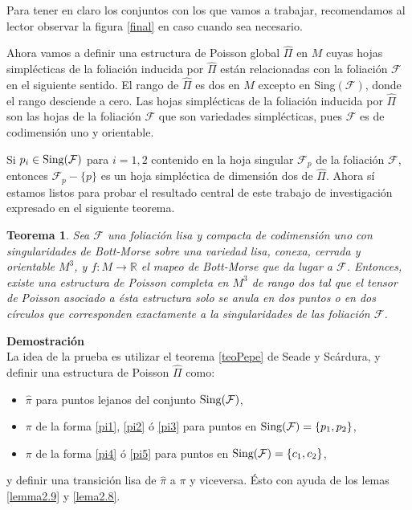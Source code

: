 \documentclass[a4paper,10pt]{book}
\newtheorem{teo}{Teorema}[chapter]
\begin{document}
Para tener en claro los conjuntos con los que vamos a trabajar, recomendamos al lector observar la figura \ref{final} en caso cuando sea necesario.
\vspace{5mm}

Ahora vamos a definir una estructura de Poisson global $\hat{\Pi}$ en $M$ cuyas hojas simpl\'ecticas de la foliaci\'on inducida por $\hat{\Pi}$ est\'an relacionadas con la foliaci\'on $\mathcal{F}$ en el siguiente sentido. El rango de $\hat{\Pi}$ es dos en $M$ excepto en {\rm Sing$(\mathcal{F})$}, donde el rango desciende a cero. Las hojas simpl\'ecticas de la foliaci\'on inducida por $\hat{\Pi}$ son las hojas de la foliaci\'on $\mathcal{F}$ que son variedades simpl\'ecticas, pues $\mathcal{F}$ es de codimensi\'on uno y orientable.
\vspace{5mm}

Si $p_{i}\in{\rm Sing(\mathcal{F})}$ para $i=1,2$ contenido en la hoja singular $\mathcal{F}_{p}$ de la foliaci\'on $\mathcal{F}$, entonces $\mathcal{F}_{p}-\{p\}$ es un hoja simpl\'ectica de dimensi\'on dos de $\hat{\Pi}$. Ahora s\'i estamos listos para probar el resultado central de este trabajo de investigaci\'on expresado en el siguiente teorema.

\begin{teo}\label{ElTeo}
Sea $\mathcal{F}$ una foliaci\'on lisa y compacta de codimensi\'on uno con singularidades de Bott-Morse sobre una variedad lisa, conexa, cerrada y orientable $M^{3}$, y $f:M\to\mathbb{R}$ el mapeo de Bott-Morse que da lugar a $\mathcal{F}$. Entonces, existe una estructura de Poisson completa en $M^{3}$ de rango dos tal que el tensor de Poisson asociado a \'esta estructura solo se anula en dos puntos o en dos c\'irculos que corresponden exactamente a la singularidades de las foliaci\'on $\mathcal{F}$.       
\end{teo}
{\bfseries  Demostraci\'on}\\
La idea de la prueba es utilizar el teorema \ref{teoPepe} de Seade y  Sc\'ardura, y definir una estructura de Poisson $\hat{\Pi}$ como:
\begin{itemize}
    \item $\hat{\pi}$ para puntos lejanos del conjunto ${\rm Sing(\mathcal{F})}$,
    \item $\pi$ de la forma \ref{pi1}, \ref{pi2} \'o \ref{pi3} para puntos en ${\rm Sing(\mathcal{F})}=\{p_{1},p_{2}\}$,
    \item $\pi$ de la forma \ref{pi4} \'o \ref{pi5} para puntos en ${\rm Sing(\mathcal{F})}=\{c_{1},c_{2}\}$,
\end{itemize}
y definir una transici\'on lisa de $\hat{\pi}$ a $\pi$ y viceversa. \'Esto con ayuda de los lemas \ref{lemma2.9} y \ref{lema2.8}.\\
\end{document}
